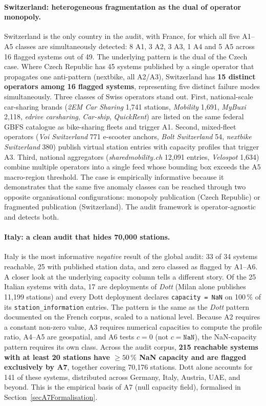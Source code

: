 \documentclass[11pt,a4paper]{article}
\begin{document}
\paragraph{Switzerland: heterogeneous fragmentation as the dual of operator monopoly.}
Switzerland is the only country in the audit, with France, for which
all five A1--A5 classes are simultaneously detected: 8 A1, 3 A2, 3
A3, 1 A4 and 5 A5 across 16 flagged systems out of 49. The
underlying pattern is the dual of the Czech case. Where Czech
Republic has 45 systems published by a single operator that
propagates one anti-pattern (nextbike, all A2/A3), Switzerland has
\textbf{15 distinct operators among 16 flagged systems},
representing five distinct failure modes simultaneously. Three
classes of Swiss operators stand out. First, national-scale
car-sharing brands (\emph{2EM Car Sharing} 1{,}741 stations,
\emph{Mobility} 1{,}691, \emph{MyBuxi} 2{,}118, \emph{edrive
carsharing}, \emph{Car-ship}, \emph{QuickRent}) are listed on the
same federal GBFS catalogue as bike-sharing fleets and trigger A1.
Second, mixed-fleet operators (\emph{Voi Switzerland} 771 e-scooter
anchors, \emph{Bolt Switzerland} 54, \emph{nextbike Switzerland}
380) publish virtual station entries with capacity profiles that
trigger A3. Third, national aggregators
(\emph{sharedmobility.ch} 12{,}091 entries, \emph{Velospot} 1{,}634)
combine multiple operators into a single feed whose bounding box
exceeds the A5 macro-region threshold. The case is empirically
informative because it demonstrates that the same five anomaly
classes can be reached through two opposite organisational
configurations: monopoly publication (Czech Republic) or
fragmented publication (Switzerland). The audit framework is
operator-agnostic and detects both.

\paragraph{Italy: a clean audit that hides 70{,}000 stations.}
Italy is the most informative \emph{negative} result of the global
audit: 33 of 34 systems reachable, 25 with published station data,
and zero classed as flagged by A1--A6. A closer look at the
underlying capacity column tells a different story. Of the 25
Italian systems with data, 17 are deployments of \emph{Dott} (Milan
alone publishes 11{,}199 stations) and every Dott deployment
declares \texttt{capacity = NaN} on 100\,\% of its
\texttt{station\_information} entries. The pattern is the same as
the \emph{Dott} pattern documented on the French corpus, scaled to
a national level. Because A2 requires a constant non-zero value,
A3 requires numerical capacities to compute the profile ratio,
A4--A5 are geospatial, and A6 tests $c = 0$ (not
$c = \texttt{NaN}$), the NaN-capacity pattern requires its own
class. Across the audit corpus, \textbf{215 reachable systems
with at least 20 stations have $\geq 50\,\%$ NaN capacity and are
flagged exclusively by A7}, together covering 70{,}176 stations.
Dott alone accounts for 141 of these systems, distributed across
Germany, Italy, Austria, UAE, and beyond. This is the empirical
basis of A7 (null capacity field), formalised in
Section~\ref{secA7Formalisation}.
\end{document}

